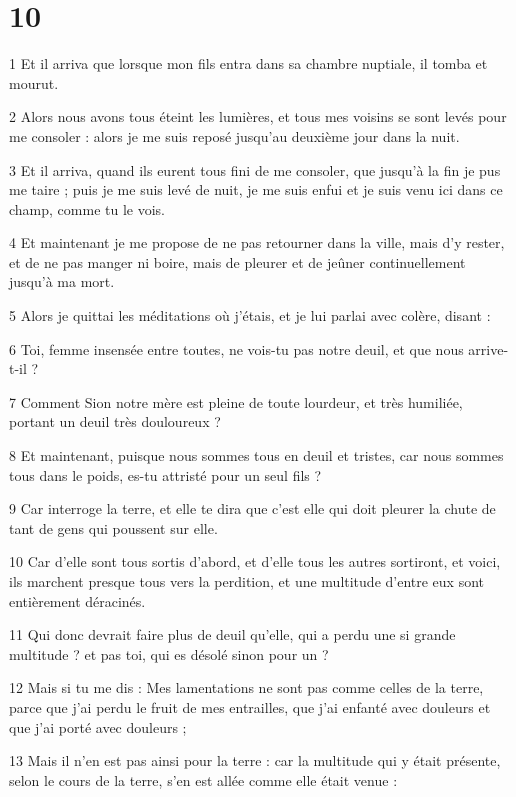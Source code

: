 \chapter{10}

\par 1 Et il arriva que lorsque mon fils entra dans sa chambre nuptiale, il tomba et mourut.
\par 2 Alors nous avons tous éteint les lumières, et tous mes voisins se sont levés pour me consoler : alors je me suis reposé jusqu'au deuxième jour dans la nuit.
\par 3 Et il arriva, quand ils eurent tous fini de me consoler, que jusqu'à la fin je pus me taire ; puis je me suis levé de nuit, je me suis enfui et je suis venu ici dans ce champ, comme tu le vois.
\par 4 Et maintenant je me propose de ne pas retourner dans la ville, mais d'y rester, et de ne pas manger ni boire, mais de pleurer et de jeûner continuellement jusqu'à ma mort.
\par 5 Alors je quittai les méditations où j'étais, et je lui parlai avec colère, disant :
\par 6 Toi, femme insensée entre toutes, ne vois-tu pas notre deuil, et que nous arrive-t-il ?
\par 7 Comment Sion notre mère est pleine de toute lourdeur, et très humiliée, portant un deuil très douloureux ?
\par 8 Et maintenant, puisque nous sommes tous en deuil et tristes, car nous sommes tous dans le poids, es-tu attristé pour un seul fils ?
\par 9 Car interroge la terre, et elle te dira que c'est elle qui doit pleurer la chute de tant de gens qui poussent sur elle.
\par 10 Car d'elle sont tous sortis d'abord, et d'elle tous les autres sortiront, et voici, ils marchent presque tous vers la perdition, et une multitude d'entre eux sont entièrement déracinés.
\par 11 Qui donc devrait faire plus de deuil qu'elle, qui a perdu une si grande multitude ? et pas toi, qui es désolé sinon pour un ?
\par 12 Mais si tu me dis : Mes lamentations ne sont pas comme celles de la terre, parce que j'ai perdu le fruit de mes entrailles, que j'ai enfanté avec douleurs et que j'ai porté avec douleurs ;
\par 13 Mais il n'en est pas ainsi pour la terre : car la multitude qui y était présente, selon le cours de la terre, s'en est allée comme elle était venue :
